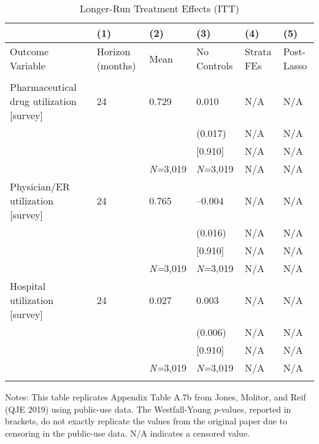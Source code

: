 \documentclass{article}
\begin{document}
\setlength{\tabcolsep}{6pt}
\begin{table}[tbp] \centering
{}

\caption{Longer-Run Treatment Effects (ITT)}
\label{tab:appendix_itt_spend_vars_survey_0816_0119}
{\scriptsize
\begin{tabularx}{\linewidth}{lCCCCC}

\toprule
&{(1)}&{(2)}&{(3)}&{(4)}&{(5)} \tabularnewline \midrule
{Outcome Variable}&{Horizon (months)}&{Mean}&{No Controls}&{Strata FEs}&{Post-Lasso} \tabularnewline
\midrule 
\addlinespace[1.4ex]
& \tabularnewline
\midrule Pharmaceutical drug utilization [survey]&24&0.729&0.010&N/A&N/A \tabularnewline
&&&(0.017)&N/A&N/A \tabularnewline
&&&[0.910]&N/A&N/A \tabularnewline
&&\textit{N=}3,019&\textit{N=}3,019&N/A&N/A \tabularnewline
\addlinespace[1.4ex]
Physician/ER utilization [survey]&24&0.765&--0.004&N/A&N/A \tabularnewline
&&&(0.016)&N/A&N/A \tabularnewline
&&&[0.910]&N/A&N/A \tabularnewline
&&\textit{N=}3,019&\textit{N=}3,019&N/A&N/A \tabularnewline
\addlinespace[1.4ex]
Hospital utilization [survey]&24&0.027&0.003&N/A&N/A \tabularnewline
&&&(0.006)&N/A&N/A \tabularnewline
&&&[0.910]&N/A&N/A \tabularnewline
&&\textit{N=}3,019&\textit{N=}3,019&N/A&N/A \tabularnewline
\bottomrule\addlinespace[-1.5ex] 

\end{tabularx}
\begin{flushleft}
\footnotesize Notes: This table replicates Appendix Table A.7b from Jones, Molitor, and Reif (QJE 2019) using public-use data. The Westfall-Young \(p\)-values, reported in brackets, do not exactly replicate the values from the original paper due to censoring in the public-use data. N/A indicates a censored value.
\end{flushleft}
}
\end{table}
\end{document}
